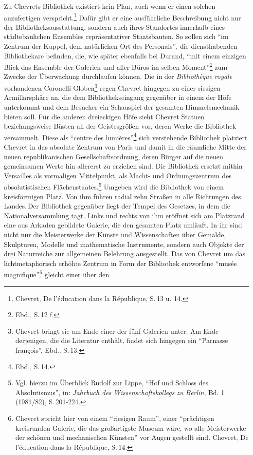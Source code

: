 Zu Chevrets Bibliothek existiert kein Plan, auch wenn er einen solchen
anzufertigen verspricht.\footnote{Chevret, De l'éducation dans la
  République, S.\,13 u. 14.} Dafür gibt er eine ausführliche Beschreibung
nicht nur der Bibliotheksausstattung, sondern auch ihres Standortes
innerhalb eines städtebaulichen Ensembles repräsentativer Staatsbauten.
So sollen sich \enquote{im Zentrum der Kuppel, dem natürlichen Ort des
Personals}, die diensthabenden Bibliothekare befinden, die, wie später
ebenfalls bei Durand, \enquote{mit einem einzigen Blick das Ensemble der
Galerien und aller Büros im selben Moment}\footnote{Ebd., S.\,12 f.} zum
Zwecke der Überwachung durchlaufen können. Die in der \emph{Bibliothèque
royale} vorhandenen Coronelli Globen\footnote{Chevret bringt sie am Ende
  einer der fünf Galerien unter. Am Ende derjenigen, die die Literatur
  enthält, findet sich hingegen ein \enquote{Parnasse françois}. Ebd.,
  S.\,13.} regen Chevret hingegen zu einer riesigen Armillarsphäre an,
die dem Bibliothekseingang gegenüber in einem der Höfe unterkommt und
dem Besucher ein Schauspiel der gesamten Himmelsmechanik bieten soll.
Für die anderen dreieckigen Höfe sieht Chevret Statuen beziehungsweise
Büsten all der Geistesgrößen vor, deren Werke die Bibliothek versammelt.
Diese als \enquote{centre des lumières}\footnote{Ebd., S.\,14.} sich
verstehende Bibliothek platziert Chevret in das absolute Zentrum von
Paris und damit in die räumliche Mitte der neuen republikanischen
Gesellschaftsordnung, deren Bürger auf die neuen gemeinsamen Werte hin
allererst zu erziehen sind. Die Bibliothek ersetzt mithin Versailles als
vormaligen Mittelpunkt, als Macht- und Ordnungszentrum des
absolutistischen Flächenstaates.\footnote{Vgl. hierzu im Überblick
  Rudolf zur Lippe, \enquote{Hof und Schloss des Absolutismus}, in:
  \emph{Jahrbuch des Wissenschaftskollegs} \emph{zu Berlin}, Bd. 1
  (1981/82), S.\,201-224.} Umgeben wird die Bibliothek von einem
kreisförmigen Platz. Von ihm führen radial zehn Straßen in alle
Richtungen des Landes.\,Der Bibliothek gegenüber liegt der Tempel des
Gesetzes, in dem die Nationalversammlung tagt. Links und rechts von ihm
eröffnet sich am Platzrand eine aus Arkaden gebildete Galerie, die den
gesamten Platz umläuft. In ihr sind nicht nur die Meisterwerke der
Künste und Wissenschaften über Gemälde, Skulpturen, Modelle und
mathematische Instrumente, sondern auch Objekte der drei Naturreiche zur
allgemeinen Belehrung ausgestellt. Das von Chevret um das
lichtmetaphorisch erhöhte Zentrum in Form der Bibliothek entworfene
\enquote{musée magnifique}\footnote{Chevret spricht hier von einem
  \enquote{riesigen Raum}, einer \enquote{prächtigen kreisrunden
  Galerie, die das großartigste Museum wäre, wo alle Meisterwerke der
  schönen und mechanischen Künsten} vor Augen gestellt sind. Chevret, De
  l'éducation dans la République, S.\,14.} gleicht einer über den
